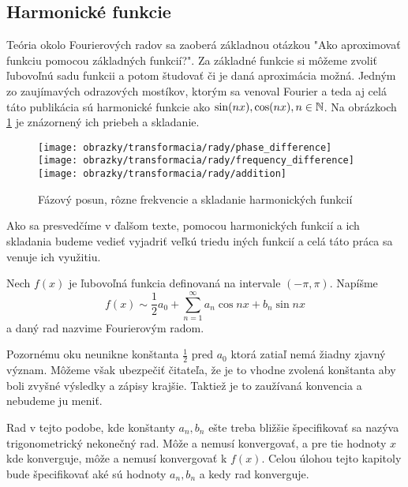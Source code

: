 \subsection{Harmonické funkcie}

Teória okolo Fourierových radov sa zaoberá základnou otázkou "Ako
aproximovať funkciu pomocou základných funkcií?".
Za základné funkcie si môžeme zvoliť ľubovoľnú sadu funkcii a potom
študovať či je daná aproximácia možná. Jedným zo zaujímavých
odrazových mostíkov, ktorým sa venoval Fourier a teda aj celá táto
publikácia sú harmonické funkcie ako $\sin(n x), \cos(nx), n \in \mathbb{N}$.
Na obrázkoch \ref{fig:harmonic_illustration} je znázornený ich priebeh a skladanie.

\begin{figure}[htp]
    \centering
    \texttt{[image: obrazky/transformacia/rady/phase\_difference]}
    \texttt{[image: obrazky/transformacia/rady/frequency\_difference]}
    \texttt{[image: obrazky/transformacia/rady/addition]}
    \caption{Fázový posun, rôzne frekvencie a skladanie harmonických
    funkcií}\label{fig:harmonic_illustration}
\end{figure}

Ako sa presvedčíme v ďalšom texte, pomocou harmonických funkcií a ich
skladania budeme vedieť vyjadriť veľkú triedu iných funkcií a celá
táto práca sa venuje ich využitiu.

\begin{definicia} Nech $f(x)$ je ľubovoľná funkcia definovaná na
intervale $(-\pi,\pi)$. Napíšme
    \begin{equation}
        f(x) \sim \frac{1}{2} a_0 + \sum_{n=1}^{\infty} a_n
        \cos n x + b_n \sin n x
    \label{eq:trig_series}
    \end{equation}
a daný rad nazvime Fourierovým radom.
    \label{def:fourier_series}
\end{definicia}

\begin{poznamka}
    Pozornému oku neunikne konštanta $\frac{1}{2}$ pred $a_0$ ktorá
    zatiaľ nemá žiadny zjavný význam. Môžeme však ubezpečiť čitateľa,
    že je to vhodne zvolená konštanta aby boli zvyšné výsledky a
    zápisy krajšie. Taktiež je to zaužívaná konvencia a nebudeme
    ju meniť.
\end{poznamka}

Rad v tejto podobe, kde konštanty $a_n, b_n$ ešte treba bližšie
špecifikovať sa nazýva trigonometrický nekonečný rad. Môže a nemusí
konvergovať, a pre tie hodnoty $x$ kde konverguje, môže a nemusí
konvergovať k $f(x)$. Celou úlohou tejto kapitoly bude špecifikovať
aké sú hodnoty $a_n, b_n$ a kedy rad konverguje.

